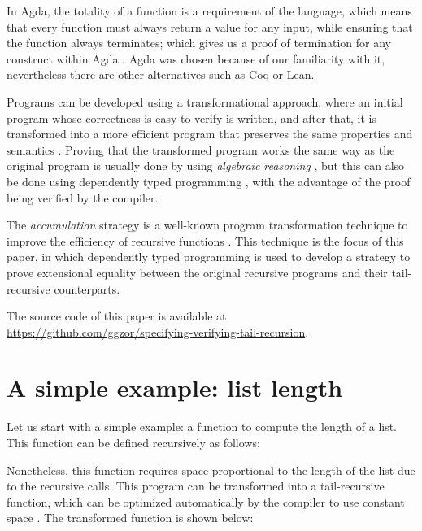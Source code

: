 \documentclass{cys}
\begin{document}
In Agda, the totality of a function is a requirement of the language, which means that
every function must always return a value for any input, while ensuring that the function
always terminates; which gives us a proof of termination for any construct within Agda
\cite{bove2009brief}. Agda was chosen because of our familiarity with it, nevertheless
there are other alternatives such as Coq\cite{bertot2013interactive} or
Lean\cite{moura2015lean}.

Programs can be developed using a transformational approach, where an initial program
whose correctness is easy to verify is written, and after that, it is transformed into a
more efficient program that preserves the same properties and semantics
\cite{pettorossi1993rules}. Proving that the transformed program works the same way as
the original program is usually done by using \emph{algebraic reasoning}
\cite{bird1996algebra}, but this can also be done using dependently typed programming
\cite{mu2008algebra}, with the advantage of the proof being verified by the compiler.

The \emph{accumulation} strategy is a well-known program transformation technique to
improve the efficiency of recursive functions \cite{bird1984promotion}. This technique is
the focus of this paper, in which dependently typed programming is used to develop a
strategy to prove extensional equality between the original recursive programs and their
tail-recursive counterparts.

The source code of this paper is available at
\url{https://github.com/ggzor/specifying-verifying-tail-recursion}.

\section{A simple example: list length}

Let us start with a simple example: a function to compute the length of a list. This
function can be defined recursively as follows:


Nonetheless, this function requires space proportional to the length of the list due to
the recursive calls. This program can be transformed into a tail-recursive function,
which can be optimized automatically by the compiler to use constant space
\cite{bauer2003compilation}. The transformed function is shown below:

\end{document}
